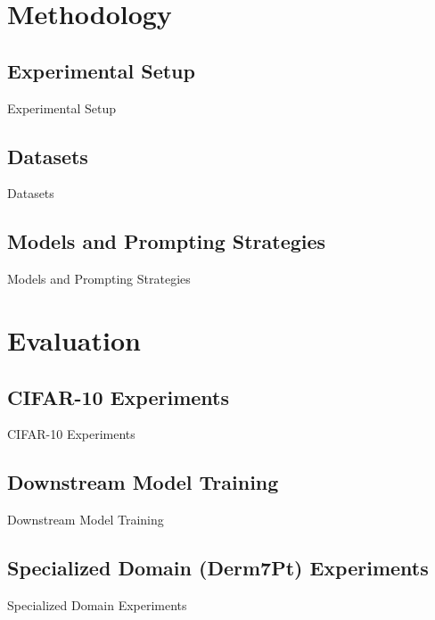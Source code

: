\documentclass[aspectratio=169]{beamer}
\begin{document}
\section{Methodology}
\subsection{Experimental Setup}
\begin{frame}{Experimental Setup}
\end{frame}

\subsection{Datasets}
\begin{frame}{Datasets}
\end{frame}

\subsection{Models and Prompting Strategies}
\begin{frame}{Models and Prompting Strategies}
\end{frame}

\section{Evaluation}
\subsection{CIFAR-10 Experiments}
\begin{frame}{CIFAR-10 Experiments}
\end{frame}

\subsection{Downstream Model Training}
\begin{frame}{Downstream Model Training}
\end{frame}

\subsection{Specialized Domain (Derm7Pt) Experiments}
\begin{frame}{Specialized Domain Experiments}
\end{frame}
\end{document}

